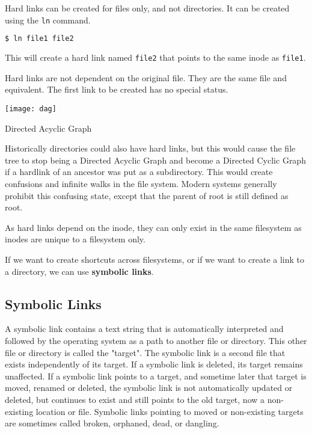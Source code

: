Hard links can be created for files only, and not directories.
It can be created using the \lstinline|ln| command.

\begin{lstlisting}[language=bash]
$ ln file1 file2
\end{lstlisting}

This will create a hard link named \lstinline|file2| that points to the same inode as \lstinline|file1|.

\begin{remark}
  Hard links are not dependent on the original file.
  They are the same file and equivalent.
  The first link to be created has no special status.
\end{remark}

\begin{marginfigure}
  \texttt{[image: dag]}
  \caption[Directed Acyclic Graph]{Directed Acyclic Graph}
\end{marginfigure}

Historically directories could also have hard links, but this would cause the file tree to stop being a Directed Acyclic Graph
and become a Directed Cyclic Graph if a hardlink of an ancestor was put as a subdirectory.
This would create confusions and infinite walks in the file system.
Modern systems generally prohibit this confusing state, except that the parent of root is still defined as root.

As hard links depend on the inode, they can only exist in the same filesystem as inodes are unique to a filesystem only.

If we want to create shortcuts across filesystems, or if we want to create a link to a directory, we can use \textbf{symbolic links}.

\subsection{Symbolic Links}

A symbolic link contains a text string that is automatically interpreted and followed by the operating system as a path to another file or directory.
This other file or directory is called the "target".
The symbolic link is a second file that exists independently of its target.
If a symbolic link is deleted, its target remains unaffected.
If a symbolic link points to a target, and sometime later that target is moved, renamed or deleted, the symbolic link is not automatically updated or deleted, but continues to exist and still points to the old target, now a non-existing location or file.
Symbolic links pointing to moved or non-existing targets are sometimes called broken, orphaned, dead, or dangling.

